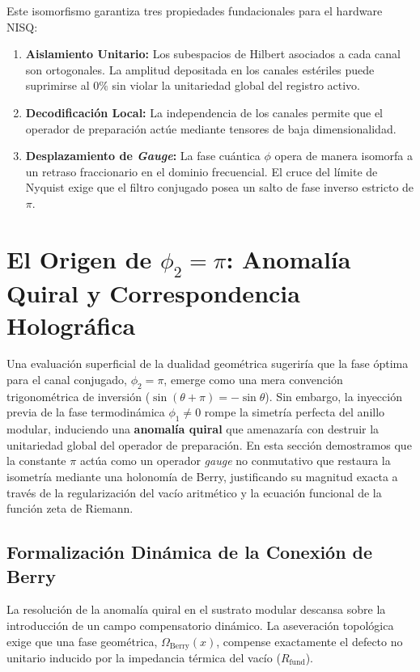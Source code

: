 \documentclass[12pt,a4paper]{article}
\theoremstyle{plain}
\theoremstyle{definition}
\theoremstyle{remark}
\begin{document}
Este isomorfismo garantiza tres propiedades fundacionales para el hardware NISQ:
\begin{enumerate}
    \item \textbf{Aislamiento Unitario:} Los subespacios de Hilbert asociados a cada canal son ortogonales. La amplitud depositada en los canales estériles puede suprimirse al $0\%$ sin violar la unitariedad global del registro activo.
    \item \textbf{Decodificación Local:} La independencia de los canales permite que el operador de preparación actúe mediante tensores de baja dimensionalidad.
    \item \textbf{Desplazamiento de \textit{Gauge}:} La fase cuántica $\phi$ opera de manera isomorfa a un retraso fraccionario en el dominio frecuencial. El cruce del límite de Nyquist exige que el filtro conjugado posea un salto de fase inverso estricto de $\pi$.
\end{enumerate}

\section{El Origen de $\phi_2 = \pi$: Anomalía Quiral y Correspondencia Holográfica}
\label{sec:origen_pi}

Una evaluación superficial de la dualidad geométrica sugeriría que la fase óptima para el canal conjugado, $\phi_2 = \pi$, emerge como una mera convención trigonométrica de inversión ($\sin(\theta+\pi) = -\sin\theta$). Sin embargo, la inyección previa de la fase termodinámica $\phi_1 \neq 0$ rompe la simetría perfecta del anillo modular, induciendo una \textbf{anomalía quiral} que amenazaría con destruir la unitariedad global del operador de preparación. En esta sección demostramos que la constante $\pi$ actúa como un operador \textit{gauge} no conmutativo que restaura la isometría mediante una holonomía de Berry, justificando su magnitud exacta a través de la regularización del vacío aritmético y la ecuación funcional de la función zeta de Riemann.

\subsection{Formalización Dinámica de la Conexión de Berry}
\label{subsec:berry_formalism}

La resolución de la anomalía quiral en el sustrato modular descansa sobre la introducción de un campo compensatorio dinámico. La aseveración topológica exige que una fase geométrica, $\Omega_{\text{Berry}}(x)$, compense exactamente el defecto no unitario inducido por la impedancia térmica del vacío ($R_{\text{fund}}$).
\end{document}
